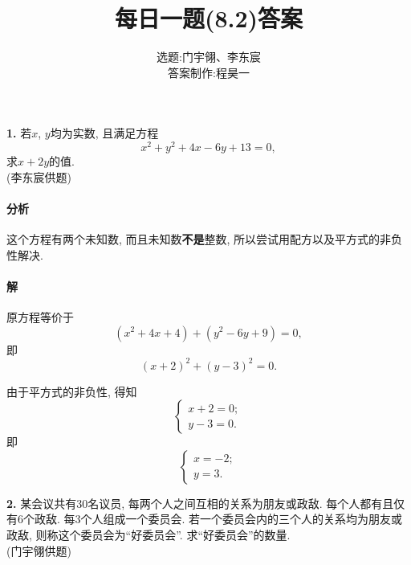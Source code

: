 \documentclass{article}
\title{每日一题(8.2)答案}
\author{选题:门宇翎、李东宸\\答案制作:程昊一}
\begin{document}
\maketitle
\textbf{1.}{\kaishu 
若$x$, $y$均为实数, 且满足方程
\[x^2+y^2+4x-6y+13=0,\]
求$x+2y$的值.\\
(李东宸供题)}\\
\paragraph{分析}这个方程有两个未知数, 而且未知数\textbf{不是}整数, 所以尝试用配方以及平方式的非负性解决.
\paragraph{解}原方程等价于
\[(x^2+4x+4)+(y^2-6y+9)=0,\]
即
\[(x+2)^2+(y-3)^2=0.\]
\par 由于平方式的非负性, 得知
\[\begin{cases}
	x+2=0;\\y-3=0.
\end{cases}\]
即
\[\begin{cases}
	x=-2;\\y=3.
\end{cases}\]

\par\textbf{2.}{\kaishu 
某会议共有30名议员, 每两个人之间互相的关系为朋友或政敌. 每个人都有且仅有6个政敌. 每3个人组成一个委员会. 若一个委员会内的三个人的关系均为朋友或政敌, 则称这个委员会为“好委员会”. 求“好委员会”的数量. \\
(门宇翎供题)}
\end{document}

